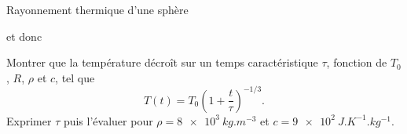 \begin{exo}[PC][2][TD]{Rayonnement thermique d'une sphère}
\begin{quest}
{$$$$
et donc 
  }
  \item Montrer que la température décroît sur un temps caractéristique $\tau$, fonction de $T_0$, $R$, $\rho$ et $c$, tel que  
  \begin{equation}
    T(t) = T_0 \left(1 + \frac{t}{\tau}\right)^{-1/3}.
  \end{equation}
  Exprimer $\tau$ puis l'évaluer pour $\rho=\SI{8e3}{kg.m^{-3}}$ et $c=\SI{9e2}{J.K^{-1}.kg^{-1}}$.
\end{quest}
\end{exo}

